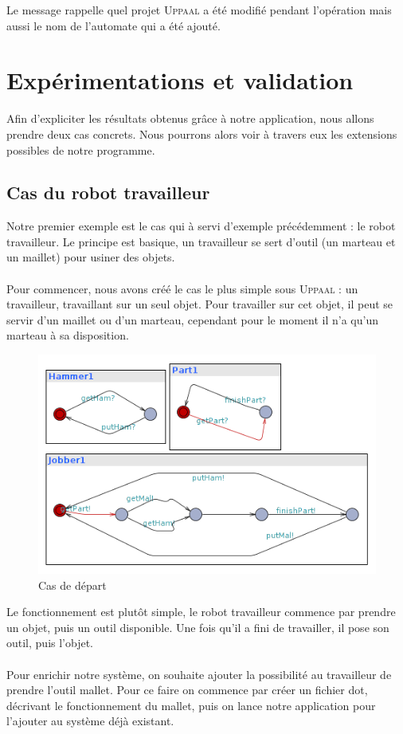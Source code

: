 \documentclass[12pt,a4paper]{report}
\begin{document}
Le message rappelle quel projet \textsc{Uppaal} a été modifié pendant l'opération mais 
aussi le nom de l'automate qui a été ajouté.

\chapter{Expérimentations et validation}

    Afin d'expliciter les résultats obtenus grâce à notre application, nous allons 
    prendre deux cas concrets. Nous pourrons alors voir à travers eux les extensions 
    possibles de notre programme.
    
    \section{Cas du robot travailleur}
    
    Notre premier exemple est le cas qui à servi d'exemple précédemment : le robot travailleur.
    Le principe est basique, un travailleur se sert d'outil (un marteau et un maillet) 
    pour usiner des objets.
\\\\
    Pour commencer, nous avons créé le cas le plus simple sous \textsc{Uppaal} : un travailleur, 
    travaillant sur un seul objet. Pour travailler sur cet objet, il peut se servir 
    d'un maillet ou d'un marteau, cependant pour le moment il n'a qu'un marteau à sa 
    disposition.

\begin{figure}[H]
  \centering
  \includegraphics[scale=0.6]{ressources/workerBasic.png}
  \caption{Cas de départ}
\end{figure}

    Le fonctionnement est plutôt simple, le robot travailleur commence par prendre un objet, puis un outil disponible. Une fois qu'il a fini de travailler, il pose son outil, puis l'objet.
\\\\
    Pour enrichir notre système, on souhaite ajouter la possibilité au travailleur de prendre l'outil mallet. Pour ce faire on commence par créer un fichier dot, décrivant le fonctionnement du mallet, puis on lance notre application pour l'ajouter au système déjà existant.
    
\end{document}
